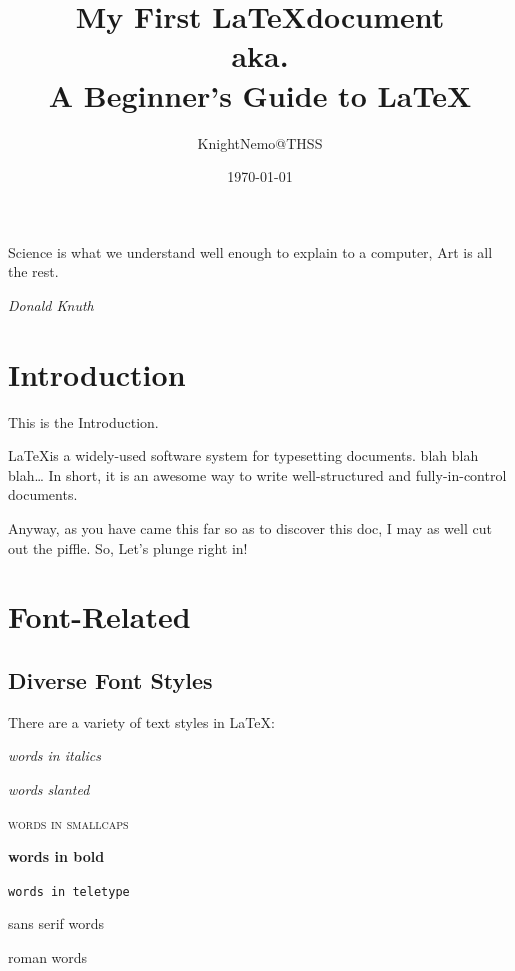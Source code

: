 \documentclass[a4paper,12pt]{article}
\begin{document}
\title{My First \LaTeX document
\\aka. \\A Beginner's Guide to \LaTeX}
\author{KnightNemo@THSS}
\date{\today}
\maketitle
\newpage


\tableofcontents
\newpage
{}

\begin{quotation}
\end{quotation}
\epigraph{ Science is what we understand well enough to explain to a computer, Art is all the rest. }
{\textit{Donald Knuth}}

\section{Introduction}
    This is the Introduction.

    \LaTeX is a widely-used software system for typesetting documents.
    blah blah blah\dots
    In short, it is an awesome way to
    write well-structured and fully-in-control documents.

    Anyway, as you have came this far so as to discover this doc,
    I may as well cut out the piffle. 
    So, Let's plunge right in!

\section{Font-Related}

    \subsection{Diverse Font Styles}
    \label{sec1}
    There are a variety of text styles in \LaTeX: 

        \textit{words in italics}

        \textsl{words slanted}

        \textsc{words in smallcaps}

        \textbf{words in bold}

        \texttt{words in teletype}

        \textsf{sans serif words}

        \textrm{roman words}
\end{document}
